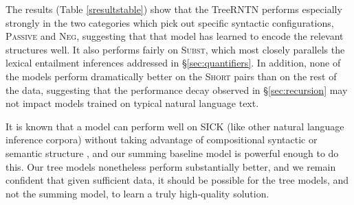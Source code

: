 The results (Table \ref{sresultstable}) show that the TreeRNTN performs especially strongly in the two categories which pick out specific syntactic configurations, \textsc{Passive} and \textsc{Neg}, suggesting that that model has learned to encode the relevant structures well. It also performs fairly on \textsc{Subst}, which most closely parallels the lexical entailment inferences addressed in \S\ref{sec:quantifiers}. In addition, none of the models perform dramatically better on the \textsc{Short} pairs than on the rest of the data, suggesting that the performance decay observed in \S\ref{sec:recursion} may not impact models trained on typical natural language text.

It is known that a model can perform well on SICK (like other natural language inference corpora) without taking advantage of compositional syntactic or semantic structure \cite{marelli2014semeval}, and our summing baseline model is powerful enough to do this. Our tree models nonetheless perform substantially better, and we remain confident that given sufficient data, it should be possible for the tree models, and not the summing model, to learn a truly high-quality solution.
